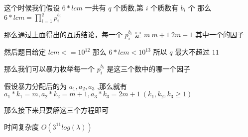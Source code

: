 \documentclass[12pt, a4paper, oneside]{ctexart}
\begin{document}
\hspace*{\fill} \par
这个时候我们假设 $6*lcm$ 一共有 $q$ 个质数,第 $i$ 个质数有 $b_i$ 个 那么 $6*lcm=\prod_{i=1}^{q} p_i^{b_i}$ \par 
\hspace*{\fill} \par
那么通过上面得出的互质结论，每一个 $p_i^{b_i}$ 是 $m\ m+1 \ 2m+1$ 其中一个的因子 \par 
\hspace*{\fill} \par
然后题目给定 $lcm<=10^{12}$ 那么 $6*lcm<10^{13}$ 所以 $q$ 最大不超过 $11$  \par 
\hspace*{\fill} \par
那么我们可以暴力枚举每一个 $p_i^{b_i}$ 是这三个数中的哪一个因子 \par 
\hspace*{\fill} \par
假设暴力分配后的为 $a_1,a_2,a_3$ ,那么就有 $a_1*k_1=m,a_2*k_2=m+1,a_3*k_3=2m+1\ (k_1,k_2,k_3\geq1)$ \par 
\hspace*{\fill} \par
那么接下来只要解这三个方程即可  \par 
时间复杂度 $O(3^{11}log(\lambda))$   \par 
\end{document}
